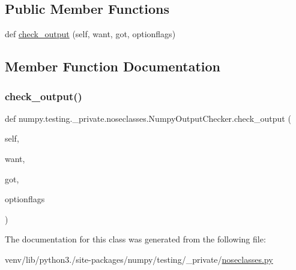 \subsection*{Public Member Functions}
\begin{DoxyCompactItemize}
\item 
def \hyperlink{classnumpy_1_1testing_1_1__private_1_1noseclasses_1_1NumpyOutputChecker_a8a69ccd91562eb5fd93fb15901a1f945}{check\+\_\+output} (self, want, got, optionflags)
\end{DoxyCompactItemize}


\subsection{Member Function Documentation}
\mbox{\label{classnumpy_1_1testing_1_1__private_1_1noseclasses_1_1NumpyOutputChecker_a8a69ccd91562eb5fd93fb15901a1f945}} 
\subsubsection{\texorpdfstring{check\+\_\+output()}{check\_output()}}
{\footnotesize\ttfamily def numpy.\+testing.\+\_\+private.\+noseclasses.\+Numpy\+Output\+Checker.\+check\+\_\+output (\begin{DoxyParamCaption}\item[{}]{self,  }\item[{}]{want,  }\item[{}]{got,  }\item[{}]{optionflags }\end{DoxyParamCaption})}



The documentation for this class was generated from the following file\+:\begin{DoxyCompactItemize}
\item 
venv/lib/python3./site-\/packages/numpy/testing/\+\_\+private/\hyperlink{noseclasses_8py}{noseclasses.\+py}\end{DoxyCompactItemize}
